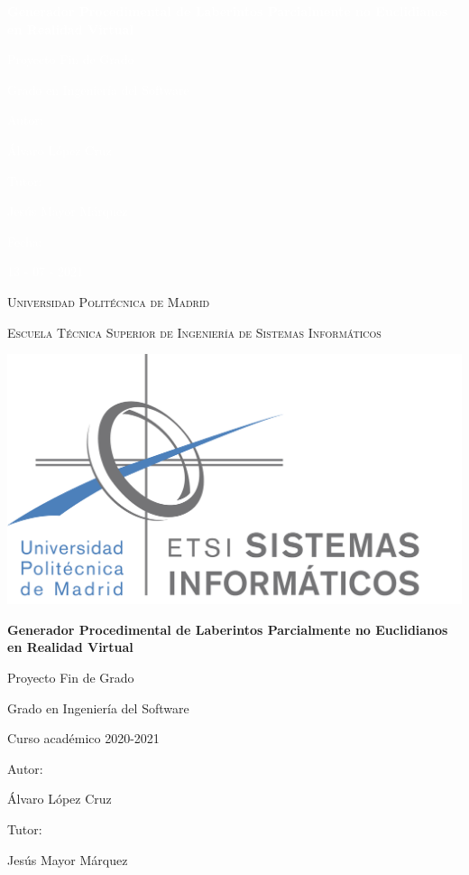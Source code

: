 \documentclass[a4paper]{report}
\begin{document}
\begin{titlepage}
{\bfseries\Huge \textcolor{white}{Generador Procedimental de Laberintos Parcialmente no Euclidianos en Realidad Virtual} \par}
\vfill
{\Large \textcolor{white}{Proyecto Fin de Grado} \par}
\vfill
{\Large \textcolor{white}{Grado en Ingeniería del Software} \par}
\vfill
{\Large \textcolor{white}{Autor:} \par}
{\Large \textcolor{white}{Álvaro López Cruz} \par}
\vfill
{\Large \textcolor{white}{Tutor:} \par}
{\Large \textcolor{white}{Jesús Mayor Márquez} \par}
\vfill
{\Large \textcolor{white}{Fecha:} \par}
{\Large \textcolor{white}{13 - 07 - 2021} \par}
\newpage

\thispagestyle{empty}
\centering %
{\scshape\Large  Universidad Politécnica de Madrid \par}
{\scshape\Large Escuela Técnica Superior de Ingeniería de Sistemas Informáticos \par}
\vfill
{\includegraphics[width=1\textwidth]{logo_etsisi.png}\par}
\vfill
{\bfseries\LARGE Generador Procedimental de Laberintos Parcialmente no Euclidianos en Realidad Virtual \par}
\vfill
{\Large Proyecto Fin de Grado \par}
\vfill
{\Large Grado en Ingeniería del Software \par}
\vfill
{\Large Curso académico 2020-2021 \par}
\vfill
{\Large Autor: \par}
{\Large Álvaro López Cruz \par}
\vfill
{\Large Tutor: \par}
{\Large Jesús Mayor Márquez \par}

\end{titlepage}
\end{document}

